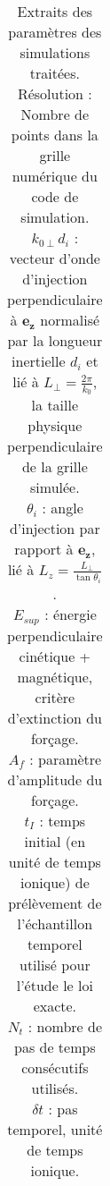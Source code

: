 \begin{table}[!ht]
\begin{center}
\begin{tabular}{ c|c|c|c|c|c|c|c|c }
 \end{tabular}
% 
\cprotect\caption{Extraits des paramètres des simulations traitées. \\Résolution : Nombre de points dans la grille numérique du code de simulation. \\ 
\ensuremath{k_{0 \perp}d_i} : vecteur d'onde d'injection perpendiculaire à \ensuremath{\boldsymbol{e_z}} normalisé par la longueur inertielle \ensuremath{d_i} et lié à \ensuremath{L_{\perp} =\frac{2\pi}{k_{0}}}, la taille physique perpendiculaire de la grille simulée. \\ 
\ensuremath{\theta_i} : angle d'injection par rapport à \ensuremath{\boldsymbol{e_z}}, lié à \ensuremath{L_{z} =\frac{L_{\perp}}{\tan \theta_i }}. \\ 
\ensuremath{E_{sup}}  : énergie perpendiculaire cinétique + magnétique, critère d'extinction du forçage. \\ 
\ensuremath{A_f} : paramètre d'amplitude du forçage.\\
\ensuremath{t_I} : temps initial (en unité de temps ionique) de prélèvement de l'échantillon temporel utilisé pour l'étude le loi exacte. \\
\ensuremath{N_t} : nombre de pas de temps consécutifs utilisés. \\
\ensuremath{\delta t} : pas temporel, unité de temps ionique.}  \label{tab:setups}


\end{center}
\end{table}

